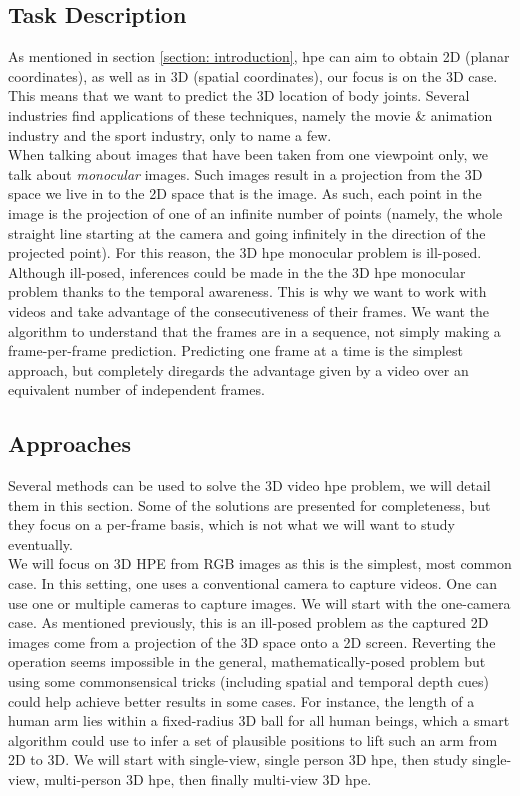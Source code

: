 \documentclass[runningheads]{llncs}
\begin{document}
\subsection{Task Description}
As mentioned in section \ref{section: introduction}, \ac{hpe} can aim to obtain 2D (planar coordinates), as well as in 3D (spatial coordinates), our focus is on the 3D case. This means that we want to predict the 3D location of body joints. Several industries find applications of these techniques, namely the movie \& animation industry and the sport industry, only to name a few. \\
When talking about images that have been taken from one viewpoint only, we talk about \textit{monocular} images. Such images result in a projection from the 3D space we live in to the 2D space that is the image. As such, each point in the image is the projection of one of an infinite number of points (namely, the whole straight line starting at the camera and going infinitely in the direction of the projected point). For this reason, the 3D \ac{hpe} monocular problem is ill-posed. \\
Although ill-posed, inferences could be made in the the 3D \ac{hpe} monocular problem thanks to the temporal awareness. This is why we want to work with videos and take advantage of the consecutiveness of their frames. We want the algorithm to understand that the frames are in a sequence, not simply making a frame-per-frame prediction. Predicting one frame at a time is the simplest approach, but completely diregards the advantage given by a video over an equivalent number of independent frames.

\subsection{Approaches}
Several methods can be used to solve the 3D video \ac{hpe} problem, we will detail them in this section. Some of the solutions are presented for completeness, but they focus on a per-frame basis, which is not what we will want to study eventually. \\
We will focus on 3D HPE from RGB images as this is the simplest, most common case. In this setting, one uses a conventional camera to capture videos. One can use one or multiple cameras to capture images. We will start with the one-camera case. As mentioned previously, this is an ill-posed problem as the captured 2D images come from a projection of the 3D space onto a 2D screen. Reverting the operation seems impossible in the general, mathematically-posed problem but using some commonsensical tricks (including spatial and temporal depth cues) could help achieve better results in some cases. For instance, the length of a human arm lies within a fixed-radius 3D ball for all human beings, which a smart algorithm could use to infer a set of plausible positions to lift such an arm from 2D to 3D. We will start with single-view, single person 3D \ac{hpe}, then study single-view, multi-person 3D \ac{hpe}, then finally multi-view 3D \ac{hpe}.
\end{document}
